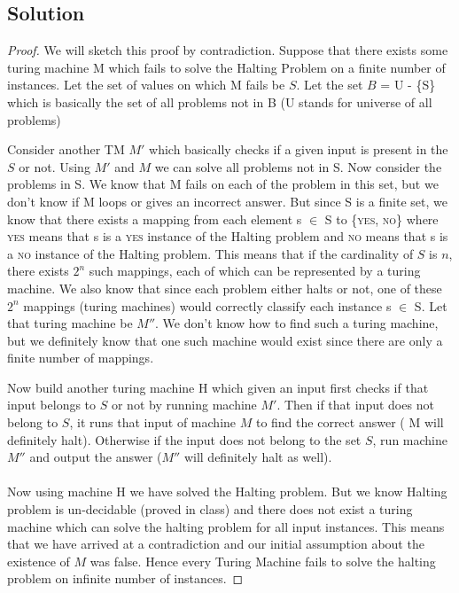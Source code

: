 \documentclass[11pt]{article}
\begin{document}
\subsection{Solution}
\begin{proof}
We will sketch this proof by contradiction. Suppose that there exists some turing machine M which fails to solve the Halting Problem on a finite number of instances. Let the set of values on which M fails be $S$. Let the set $B$ = U - \{S\} which is basically the set of all problems not in B (U stands for universe of all problems)

Consider another TM $M'$ which basically checks if a given input is present in the $S$ or not. Using $M'$ and $M$ we can solve all problems not in S. Now consider the problems in S. We know that M fails on each of the problem in this set, but we don't know if M loops or gives an incorrect answer. But since S is a finite set, we know that there exists a mapping from each element s $\in$ S to \{\textsc{yes}, \textsc{no}\} where \textsc{yes} means that s is a \textsc{yes} instance of the Halting problem and \textsc{no} means that s is a \textsc{no} instance of the Halting problem. This means that if the cardinality of $S$ is $n$, there exists $2^n$ such mappings, each of which can be represented by a turing machine. We also know that since each problem either halts or not, one of these $2^n$ mappings (turing machines) would correctly classify each instance s $\in$ S. Let that turing machine be $M''$. We don't know how to find such a turing machine, but we definitely know that one such machine would exist since there are only a finite number of mappings.

Now build another turing machine H which given an input first checks if that input belongs to $S$ or not by running machine $M'$. Then if that input does not belong to $S$, it runs that input of machine $M$ to find the correct answer ( M will definitely halt). Otherwise if the input does not belong to the set $S$, run machine $M''$ and output the answer ($M''$ will definitely halt as well). \\\\
Now using machine H we have solved the Halting problem. But we know Halting problem is un-decidable (proved in class) and there does not exist a turing machine which can solve the halting problem for all input instances. This means that we have arrived at a contradiction and our initial assumption about the existence of $M$ was false. Hence every Turing Machine fails to solve the halting problem on infinite number of instances.
\end{proof}
\end{document}
